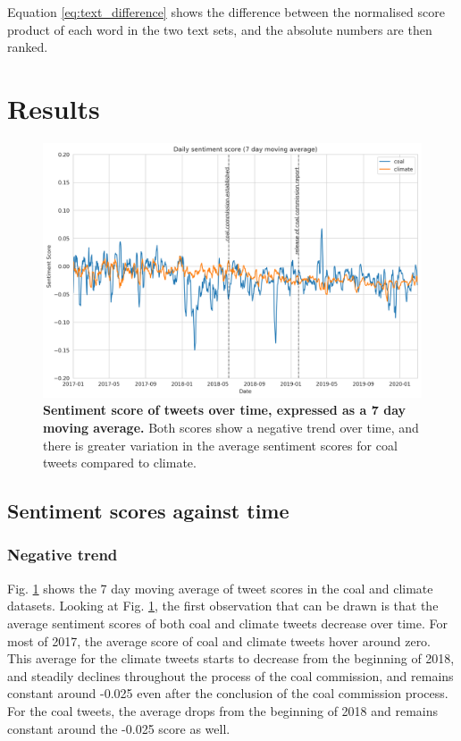 \documentclass[12pt,onecolumn,twoside]{layout}
\begin{document}
Equation \ref{eq:text_difference} shows the difference between the normalised score product of each word in the two text sets, and the absolute numbers are then ranked.

\section{Results} \label{sec:results}

\begin{figure}
	\begin{center}
		\includegraphics[width=\linewidth]{figures/sa_dailyavgsenti_7dma_baseline2}
	\end{center}
	\caption{\textbf{Sentiment score of tweets over time, expressed as a 7 day moving average.} Both scores show a negative trend over time, and there is greater variation in the average sentiment scores for coal tweets compared to climate.}
	\label{fig:tweet_score}
\end{figure}

\subsection*{Sentiment scores against time}
\subsubsection*{Negative trend} %
Fig. \ref{fig:tweet_score} shows the 7 day moving average of tweet scores in the coal and climate datasets. Looking at Fig. \ref{fig:tweet_score}, the first observation that can be drawn is that the average sentiment scores of both coal and climate tweets decrease over time. For most of 2017, the average score of coal and climate tweets hover around zero. This average for the climate tweets starts to decrease from the beginning of 2018, and steadily declines throughout the process of the coal commission, and remains constant around -0.025 even after the conclusion of the coal commission process. For the coal tweets, the average drops from the beginning of 2018 and remains constant around the -0.025 score as well.
\end{document}
